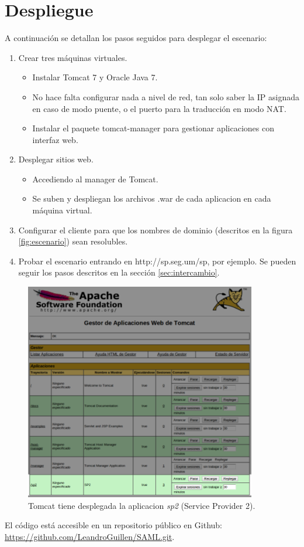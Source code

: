 \section{Despliegue}

A continuación se detallan los pasos seguidos para desplegar el escenario:

\begin{enumerate}
 \item Crear tres máquinas virtuales.
 \begin{itemize}
  \item Instalar Tomcat 7 y Oracle Java 7.
  \item No hace falta configurar nada a nivel de red, tan solo saber la IP asignada en caso de modo puente, o el puerto para la traducción en modo NAT.
  \item Instalar el paquete tomcat-manager para gestionar aplicaciones con interfaz web.
 \end{itemize}
 \item Desplegar sitios web.
 \begin{itemize}
  \item Accediendo al manager de Tomcat.
  \item Se suben y despliegan los archivos .war de cada aplicacion en cada máquina virtual.
 \end{itemize}
 \item Configurar el cliente para que los nombres de dominio (descritos en la figura \ref{fig:escenario}) sean resolubles.
 \item Probar el escenario entrando en http://sp.seg.um/sp, por ejemplo. Se pueden seguir los pasos descritos en la sección \ref{sec:intercambio}.
\end{enumerate}

\begin{figure}[h!]
\centering
\includegraphics[width=0.9\textwidth]{img/tomcat}
\caption{Tomcat tiene desplegada la aplicacion \emph{sp2} (Service Provider 2).}
\label{fig:tomcat}
\end{figure}

El código está accesible en un repositorio público en Github: \url{https://github.com/LeandroGuillen/SAML.git}.